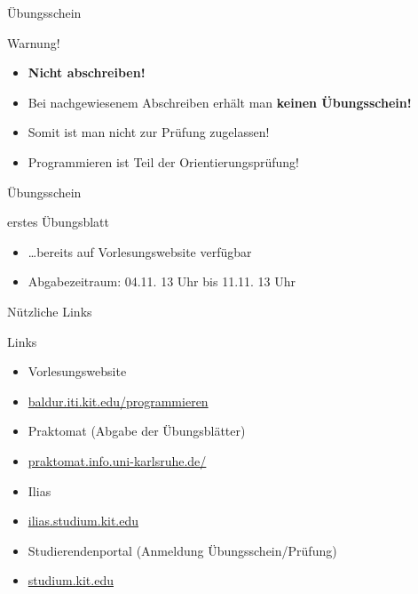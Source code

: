 \documentclass[18pt]{beamer}
\begin{document}
\begin{frame}{Übungsschein}
	\begin{alertblock}{Warnung!}
		\begin{itemize}
			\item \textbf{Nicht abschreiben!}
			\item Bei nachgewiesenem Abschreiben erhält man \textbf{keinen Übungsschein!}
			\item Somit ist man nicht zur Prüfung zugelassen!
			\item Programmieren ist Teil der Orientierungsprüfung!
		\end{itemize}
	\end{alertblock}	
\end{frame}

\begin{frame}{Übungsschein}
	\begin{block}{erstes Übungsblatt}
		\begin{itemize}
			\item \dots bereits auf Vorlesungswebsite verfügbar
			\item Abgabezeitraum: 04.11. 13 Uhr bis 11.11. 13 Uhr
		\end{itemize}
	\end{block}
\end{frame}

\begin{frame}{Nützliche Links}
	\begin{block}{Links}
	\begin{itemize}
		\item Vorlesungswebsite
		\item[] \url{baldur.iti.kit.edu/programmieren}
		\item Praktomat (Abgabe der Übungsblätter)
		\item[] \url{praktomat.info.uni-karlsruhe.de/}
		\item Ilias
		\item[] \url{ilias.studium.kit.edu}
		\item Studierendenportal (Anmeldung Übungsschein/Prüfung)
		\item[] \url{studium.kit.edu}
	\end{itemize}
	\end{block}
\end{frame}
\end{document}

